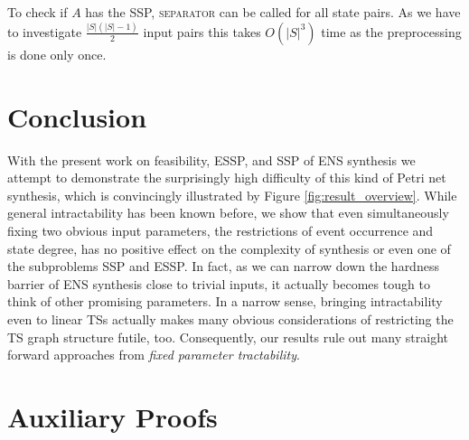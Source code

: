 \documentclass[english]{lipics_hacked}
\begin{document}
To check if $A$ has the SSP, \textsc{separator} can be called for all state pairs.
As we have to investigate $\frac{\vert S\vert(\vert S\vert -1)}{2}$ input pairs this takes $O(\vert S\vert^3)$ time as the preprocessing is done only once.


\section{Conclusion}

With the present work on feasibility, ESSP, and SSP of ENS synthesis we attempt to demonstrate the surprisingly high difficulty of this kind of Petri net synthesis, which is convincingly illustrated by Figure \ref{fig:result_overview}.
While general intractability has been known before, we show that even simultaneously fixing two obvious input parameters, the restrictions of event occurrence and state degree, has no positive effect on the complexity of synthesis or even one of the subproblems SSP and ESSP.
In fact, as we can narrow down the hardness barrier of ENS synthesis close to trivial inputs, it actually becomes tough to think of other promising parameters.
In a narrow sense, bringing intractability even to linear TSs actually makes many obvious considerations of restricting the TS graph structure futile, too.
Consequently, our results rule out many straight forward approaches from \emph{fixed parameter tractability}.


\section{Auxiliary Proofs}
\label{sec:Secondary_Proofs}
\end{document}
